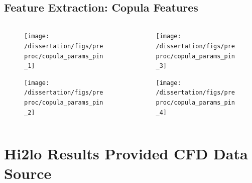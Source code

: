 \documentclass[t, pdftex]{beamer}
\begin{document}
\subsection*{Feature Extraction: Copula Features}
\begin{frame}
\vspace{-34pt}
\begin{columns}
    \begin{column}{0.5\textwidth}
        \begin{figure}[H]%
            \texttt{[image: /dissertation/figs/preproc/copula\_params\_pin\_1]}
        \end{figure}
    \vspace{-26pt}
            \begin{figure}[H]%
                \texttt{[image: /dissertation/figs/preproc/copula\_params\_pin\_2]}
            \end{figure}
    \end{column}
    \begin{column}{0.5\textwidth}
        \begin{figure}[H]%
            \texttt{[image: /dissertation/figs/preproc/copula\_params\_pin\_3]}
        \end{figure}
    \vspace{-26pt}
            \begin{figure}[H]%
                \texttt{[image: /dissertation/figs/preproc/copula\_params\_pin\_4]}
            \end{figure}
\end{column}
\end{columns}
\end{frame}

\section[Results]{Hi2lo Results Provided CFD Data Source}
\end{document}
